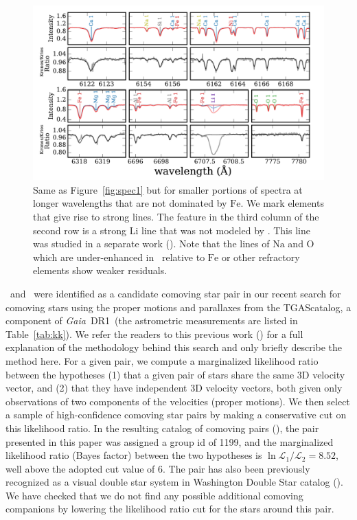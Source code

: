 \documentclass[manuscript]{aastex6}
\newcommand{\project}[1]{\textsl{#1}}
\newcommand{\acronym}[1]{{\small{#1}}}
\newcommand{\gaia}{\project{Gaia}}
\newcommand{\figname}{Figure}
\newcommand{\dr}{\acronym{DR1}}
\newcommand{\tgas}{\acronym{TGAS}}
\newcommand*\elem[1]{\ensuremath{\mathrm{#1}}}
\newcommand{\sunanalog}{\text{Krios}}
\newcommand{\bizarreone}{\text{Kronos}}
\renewcommand\tablename{Table}
\begin{document}
\begin{figure}[htpb]
  \centering
  \includegraphics[width=0.95\linewidth]{spec2.pdf}
  \caption{Same as \figname~\ref{fig:spec1}
    but for smaller portions of spectra at longer wavelengths that are
    not dominated by \elem{Fe}.
    We mark elements that give rise to strong lines.
    The feature in the third column of the second row is a strong \elem{Li}
    line that was not modeled by \citealt{2016ApJS..225...32B}. This line was
    studied in a separate work (\citealt{jmlithium}).
    Note that the lines of \elem{Na} and \elem{O} which are under-enhanced
    in \bizarreone\ relative to \elem{Fe} or other refractory elements
    show weaker residuals.
  }
  \label{fig:spec2}
\end{figure}

\sunanalog\ and \bizarreone\ were identified as a
candidate comoving star pair in our recent search for comoving stars using the
proper motions and parallaxes from the \tgas catalog, a component of \gaia\ \dr\
(the astrometric measurements are listed in \tablename~\ref{tab:kk}).
We refer the readers to this previous work (\citealt{2016arXiv161202440O}) for a
full explanation of the methodology behind this search and only briefly describe
the method here.
For a given pair, we compute a marginalized likelihood ratio between the
hypotheses (1) that a given pair of stars share the same 3D velocity vector, and
(2) that they have independent 3D velocity vectors, both given only observations
of two components of the velocities (proper motions).
We then select a sample of high-confidence comoving star pairs by making a
conservative cut on this likelihood ratio.
In the resulting catalog of comoving pairs (\citealt{2016arXiv161202440O}),
the pair presented in this paper was assigned a group id of 1199,
and the marginalized likelihood ratio (Bayes factor)
between the two hypotheses is $\ln{\mathcal{L}_1/\mathcal{L}_2} = 8.52$,
well above the adopted cut value of 6.
The pair has also been previously recognized as a visual double star system
in Washington Double Star catalog (\citealt{2001AJ....122.3466M}).
We have checked that we do not find any possible additional comoving companions
by lowering the likelihood ratio cut for the stars around this pair.
\end{document}
